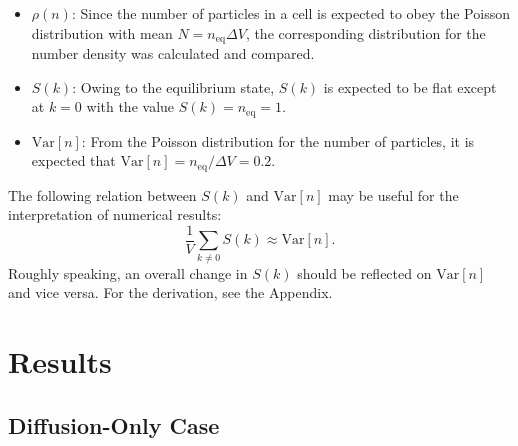 \documentclass{article}
\begin{document}
\begin{itemize}
\item $\rho(n)$: Since the number of particles in a cell is expected to obey the Poisson distribution with mean $N=n_\mathrm{eq}\Delta V$, the corresponding distribution for the number density was calculated and compared.
\item $S(k)$: Owing to the equilibrium state, $S(k)$ is expected to be flat except at $k=0$ with the value $S(k)=n_\mathrm{eq}=1$.
\item $\mathrm{Var}[n]$: From the Poisson distribution for the number of particles, it is expected that $\mathrm{Var}[n]=n_\mathrm{eq}/\Delta V=0.2$.
\end{itemize}

\noindent The following relation between $S(k)$ and $\mathrm{Var}[n]$ may be useful for the interpretation of numerical results: 
\begin{equation}
\label{sumSknonzero}
\frac{1}{V}\sum_{k\ne0}S(k)\approx \mathrm{Var}[n].
\end{equation}
Roughly speaking, an overall change in $S(k)$ should be reflected on $\mathrm{Var}[n]$ and vice versa.
For the derivation, see the Appendix.

\section{Results}

\subsection{Diffusion-Only Case}
\end{document}

